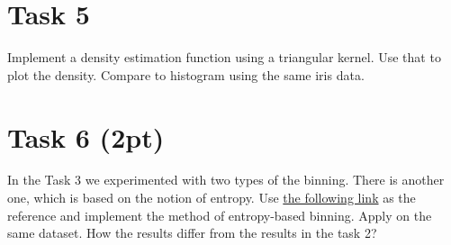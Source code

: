 \documentclass{article}
\begin{document}
\section*{Task 5}

Implement a density estimation function using a triangular kernel. Use that to plot the density. Compare to histogram using the same iris data. 

\section*{Task 6 (2pt)}
In the Task 3 we experimented with two types of the binning. There is another one, which is based on the notion of entropy. Use  \href{http://www.saedsayad.com/supervised_binning.htm}{the following link} as the reference and implement the method of entropy-based binning. Apply on the same dataset. How the results differ from the results in the task 2?
\end{document}

